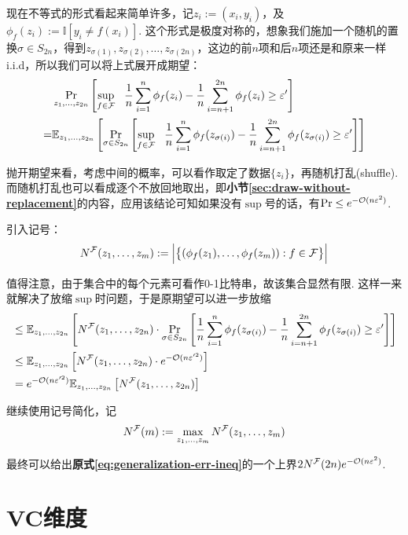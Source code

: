 现在不等式的形式看起来简单许多，记$z_i := (x_i, y_i)$，及$\phi_f(z_i) := \mathbb{I}[y_i \neq f(x_i)]$. 这个形式是极度对称的，想象我们施加一个随机的置换$\sigma \in S_{2n}$，得到$z_{\sigma(1)}, z_{\sigma(2)},\dots, z_{\sigma(2n)}$，这边的前$n$项和后$n$项还是和原来一样i.i.d，所以我们可以将上式展开成期望：
\begin{align*}
    & \Pr_{z_1, \dots, z_{2n}}\left[
        \sup_{f\in \mathcal{F}} \ \ \dfrac{1}{n} \sum_{i=1}^n \phi_f(z_i) - \dfrac{1}{n} \sum_{i=n+1}^{2n} \phi_f(z_i) \ge \varepsilon'
    \right] \\
    = & \mathbb{E}_{z_1, \dots, z_{2n}} \left[
        \Pr_{\sigma \in S_{2n}}\left[
            \sup_{f\in \mathcal{F}} \ \ \dfrac{1}{n} \sum_{i=1}^n \phi_f(z_{\sigma(i)}) - \dfrac{1}{n} \sum_{i=n+1}^{2n} \phi_f(z_{\sigma(i)}) \ge \varepsilon'
        \right]
    \right]
\end{align*}

抛开期望来看，考虑中间的概率，可以看作取定了数据$\{z_i\}$，再随机打乱(shuffle). 而随机打乱也可以看成逐个不放回地取出，即\textbf{小节\ref{sec:draw-without-replacement}}的内容，应用该结论可知如果没有$\sup$号的话，有$\Pr \le e^{-\mathcal{O}(n\varepsilon^2)}$. 

引入记号：
\[
N^{\mathcal{F}}(z_1, \dots, z_m) := \Big\vert
    \big\{
        (\phi_f(z_1), \dots, \phi_f(z_m)): f\in \mathcal{F}
    \big\}
\Big\vert
\]

值得注意，由于集合中的每个元素可看作0-1比特串，故该集合显然有限. 这样一来就解决了放缩$\sup$时问题，于是原期望可以进一步放缩
\begin{align*}
    & \le \mathbb{E}_{z_1,\dots,z_{2n}} \left[
    N^{\mathcal{F}}(z_1,\dots, z_{2n}) \cdot \Pr_{\sigma\in S_{2n}} \left[
        \dfrac{1}{n} \sum_{i=1}^n \phi_f(z_{\sigma(i)}) - \dfrac{1}{n} \sum_{i=n+1}^{2n} \phi_f(z_{\sigma(i)}) \ge \varepsilon'
    \right]
\right] \\
& \le \mathbb{E}_{z_1,\dots,z_{2n}} \left[
    N^{\mathcal{F}}(z_1,\dots, z_{2n}) \cdot e^{-\mathcal{O}(n\varepsilon'^2)}
\right] \\
& = e^{-\mathcal{O}(n\varepsilon'^2)} \mathbb{E}_{z_1,\dots,z_{2n}} \left[
    N^{\mathcal{F}}(z_1,\dots, z_{2n})
\right] 
\end{align*}

继续使用记号简化，记 
\[
N^{\mathcal{F}}(m) := \max_{z_1 ,\dots, z_m} N^{\mathcal{F}}(z_1, \dots, z_m)
\]

最终可以给出\textbf{原式\ref{eq:generalization-err-ineq}}的一个上界$2N^{\mathcal{F}}(2n)e^{-\mathcal{O}(n\varepsilon^2)}$. 

\section{VC维度}

